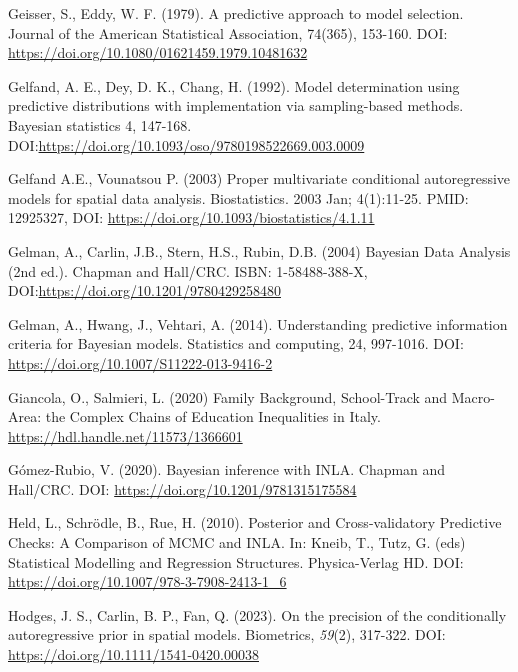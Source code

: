 \documentclass{article}
\begin{document}
\begin{thebibliography}{99}
Geisser, S., Eddy, W. F. (1979). A predictive approach to model selection. Journal of the American Statistical Association, 74(365), 153-160. DOI: \url{https://doi.org/10.1080/01621459.1979.10481632}

Gelfand, A. E., Dey, D. K., Chang, H. (1992). Model determination using predictive distributions with implementation via sampling-based methods. Bayesian statistics 4, 147-168. DOI:\url{https://doi.org/10.1093/oso/9780198522669.003.0009}

Gelfand A.E., Vounatsou P. (2003) Proper multivariate conditional autoregressive models for spatial data analysis. Biostatistics. 2003 Jan; 4(1):11-25. PMID: 12925327, DOI: \url{https://doi.org/10.1093/biostatistics/4.1.11} 

Gelman, A., Carlin, J.B., Stern, H.S., Rubin, D.B. (2004) Bayesian Data Analysis (2nd ed.). Chapman and Hall/CRC. ISBN: 1-58488-388-X, DOI:\url{https://doi.org/10.1201/9780429258480}

Gelman, A., Hwang, J., Vehtari, A. (2014). Understanding predictive information criteria for Bayesian models. Statistics and computing, 24, 997-1016. DOI: \url{https://doi.org/10.1007/S11222-013-9416-2}

Giancola, O., Salmieri, L. (2020) Family Background, School-Track and Macro-Area: the Complex Chains of Education Inequalities in Italy. \url{https://hdl.handle.net/11573/1366601 }


Gómez-Rubio, V. (2020). Bayesian inference with INLA. Chapman and Hall/CRC. DOI: \url{https://doi.org/10.1201/9781315175584}

Held, L., Schrödle, B., Rue, H. (2010). Posterior and Cross-validatory Predictive Checks: A Comparison of MCMC and INLA. In: Kneib, T., Tutz, G. (eds) Statistical Modelling and Regression Structures. Physica-Verlag HD. DOI: \url{https://doi.org/10.1007/978-3-7908-2413-1\_6} 

Hodges, J. S., Carlin, B. P., Fan, Q. (2023). On the precision of the conditionally autoregressive prior in spatial models. Biometrics, \textit{59}(2), 317-322. DOI: \url{https://doi.org/10.1111/1541-0420.00038}


\end{thebibliography}
\end{document}
